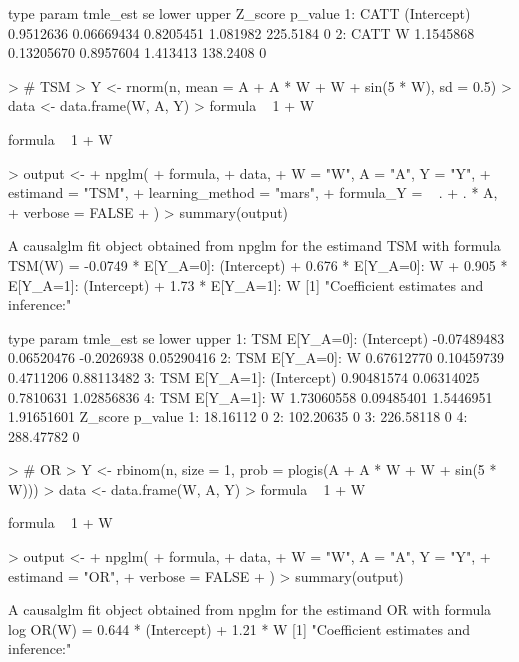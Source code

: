 \documentclass{article}
\begin{document}
\begin{Schunk}
\begin{Soutput}
   type       param  tmle_est         se     lower    upper  Z_score p_value
1: CATT (Intercept) 0.9512636 0.06669434 0.8205451 1.081982 225.5184       0
2: CATT           W 1.1545868 0.13205670 0.8957604 1.413413 138.2408       0
\end{Soutput}
\begin{Sinput}
> # TSM
> Y <- rnorm(n, mean = A + A * W + W + sin(5 * W), sd = 0.5)
> data <- data.frame(W, A, Y)
> formula ~ 1 + W
\end{Sinput}
\begin{Soutput}
formula ~ 1 + W
\end{Soutput}
\begin{Sinput}
> output <-
+   npglm(
+     formula,
+     data,
+     W = "W", A = "A", Y = "Y",
+     estimand = "TSM",
+     learning_method = "mars",
+     formula_Y = ~ . + . * A,
+     verbose = FALSE
+   )
> summary(output)
\end{Sinput}
\begin{Soutput}
A causalglm fit object obtained from npglm for the estimand TSM with formula 
TSM(W) = -0.0749 * E[Y_{A=0}]: (Intercept) + 0.676 * E[Y_{A=0}]: W + 0.905 * E[Y_{A=1}]: (Intercept) + 1.73 * E[Y_{A=1}]: W
[1] "Coefficient estimates and inference:"

   type                   param    tmle_est         se      lower      upper
1:  TSM E[Y_{A=0}]: (Intercept) -0.07489483 0.06520476 -0.2026938 0.05290416
2:  TSM           E[Y_{A=0}]: W  0.67612770 0.10459739  0.4711206 0.88113482
3:  TSM E[Y_{A=1}]: (Intercept)  0.90481574 0.06314025  0.7810631 1.02856836
4:  TSM           E[Y_{A=1}]: W  1.73060558 0.09485401  1.5446951 1.91651601
     Z_score p_value
1:  18.16112       0
2: 102.20635       0
3: 226.58118       0
4: 288.47782       0
\end{Soutput}
\begin{Sinput}
> # OR
> Y <- rbinom(n, size = 1, prob = plogis(A + A * W + W + sin(5 * W)))
> data <- data.frame(W, A, Y)
> formula ~ 1 + W
\end{Sinput}
\begin{Soutput}
formula ~ 1 + W
\end{Soutput}
\begin{Sinput}
> output <-
+   npglm(
+     formula,
+     data,
+     W = "W", A = "A", Y = "Y",
+     estimand = "OR",
+     verbose = FALSE
+   )
> summary(output)
\end{Sinput}
\begin{Soutput}
A causalglm fit object obtained from npglm for the estimand OR with formula 
log OR(W) = 0.644 * (Intercept) + 1.21 * W
[1] "Coefficient estimates and inference:"


\end{Soutput}
\end{Schunk}
\end{document}
